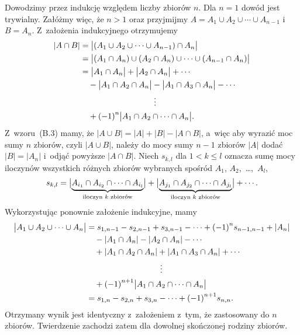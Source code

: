 \exercise %
Dowodzimy przez indukcję względem liczby zbiorów $n$. Dla $n=1$ dowód jest trywialny. Załóżmy więc, że $n>1$ oraz przyjmijmy $A=A_1\cup A_2\cup\cdots\cup A_{n-1}$ i~$B=A_n$. Z~założenia indukcyjnego otrzymujemy
\[
	\begin{split}
		|A\cap B| &= \bigl|(A_1\cup A_2\cup\cdots\cup A_{n-1})\cap A_n\bigr| \\
		&= \bigl|(A_1\cap A_n)\cup(A_2\cap A_n)\cup\cdots\cup(A_{n-1}\cap A_n)\bigr| \\
		&= \bigl|A_1\cap A_n\bigr|+\bigl|A_2\cap A_n\bigr|+\cdots{} \\
		&\quad {}-\bigl|A_1\cap A_2\cap A_n\bigr|-\bigl|A_1\cap A_3\cap A_n\bigr|-\cdots{} \\
		&\hspace{1.25in}\vdots \\
		&\quad {}+{(-1)}^n\bigl|A_1\cap A_2\cap\cdots\cap A_n\bigr|.
	\end{split}
\]
Z~wzoru~(B.3) mamy, że $|A\cup B|=|A|+|B|-|A\cap B|$, a~więc aby wyrazić moc sumy $n$ zbiorów, czyli $|A\cup B|$, należy do mocy sumy $n-1$ zbiorów $|A|$ dodać $|B|=|A_n|$ i~odjąć powyższe $|A\cap B|$. Niech $s_{k,l}$ dla $1<k\le l$ oznacza sumę mocy iloczynów wszystkich  różnych zbiorów wybranych spośród $A_1$, $A_2$,~\dots,~$A_l$,
\[
	s_{k,l} = \bigl|\underbrace{A_{i_1}\cap A_{i_2}\cap\cdots\cap A_{i_l}}_{\text{\scriptsize iloczyn $k$ zbiorów}}\bigr|+\bigl|\underbrace{A_{j_1}\cap A_{j_2}\cap\cdots\cap A_{j_l}}_{\text{\scriptsize iloczyn $k$ zbiorów}}\bigr|+\cdots{}.
\]
Wykorzystując ponownie założenie indukcyjne, mamy
\[
	\begin{split}
		\bigl|A_1\cup A_2\cup\cdots\cup A_n\bigr| &= s_{1,{n-1}}-s_{2,{n-1}}+s_{3,{n-1}}-\cdots+{(-1)}^ns_{{n-1},{n-1}}+|A_n| \\
		&\quad {}-|A_1\cap A_n|-|A_2\cap A_n|-\cdots{} \\
		&\quad {}+|A_1\cap A_2\cap A_n|+|A_1\cap A_3\cap A_n|+\cdots{} \\
		&\hspace{1.25in}\vdots \\
		&\quad {}+{(-1)}^{n+1}\bigl|A_1\cap A_2\cap\cdots\cap A_n\bigr| \\
		&= s_{1,n}-s_{2,n}+s_{3,n}-\cdots+{(-1)}^{n+1}s_{n,n}.
	\end{split}
\]
Otrzymany wynik jest identyczny z~założeniem z~tym, że zastosowany do $n$ zbiorów. Twierdzenie zachodzi zatem dla dowolnej skończonej rodziny zbiorów.

\exercise %


